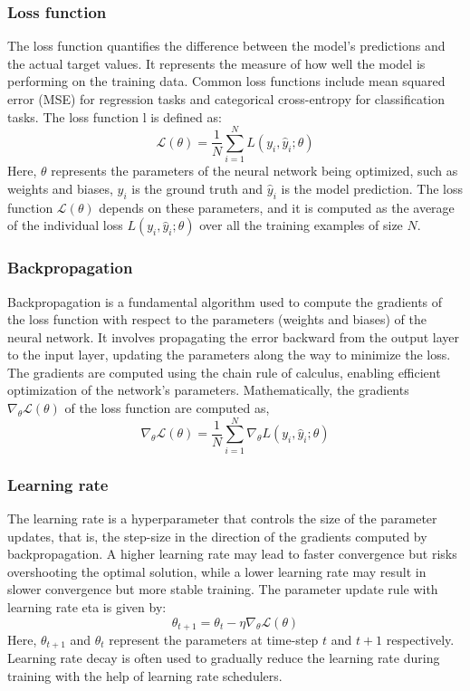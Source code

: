 \subsubsection{Loss function}
The loss function quantifies the difference between the model's predictions and the actual target values. It represents the measure of how well the model is performing on the training data. Common loss functions include mean squared error (MSE) for regression tasks and categorical cross-entropy for classification tasks. The loss function \gls{l} is defined as: 
\begin{equation}
    \mathcal{L}(\theta)=\frac{1}{N} \sum_{i=1}^N L\left(y_i, \hat{y}_i ; \theta\right)
    \end{equation}
Here, $\theta$ represents the parameters of the neural network being optimized, such as weights and biases, $y_i$ is the ground truth and $\hat{y}_i $ is the model prediction. The loss function $\mathcal{L}(\theta)$ depends on these parameters, and it is computed as the average of the individual loss $L\left(y_i, \hat{y}_i ; \theta\right)$ over all the training examples of size $N$.
\subsubsection{Backpropagation}
Backpropagation is a fundamental algorithm used to compute the gradients of the loss function with respect to the parameters (weights and biases) of the neural network. It involves propagating the error backward from the output layer to the input layer, updating the parameters along the way to minimize the loss. The gradients are computed using the chain rule of calculus, enabling efficient optimization of the network's parameters. Mathematically, the gradients $\nabla_\theta \mathcal{L}(\theta)$ of the loss function are computed as,
\begin{equation}
    \nabla_\theta \mathcal{L}(\theta)=\frac{1}{N} \sum_{i=1}^N \nabla_\theta L\left(y_i, \hat{y}_i ; \theta\right)
    \end{equation}
\subsubsection{Learning rate}
The learning rate is a hyperparameter that controls the size of the parameter updates, that is, the step-size in the direction of the gradients computed by backpropagation. A higher learning rate may lead to faster convergence but risks overshooting the optimal solution, while a lower learning rate may result in slower convergence but more stable training. The parameter update rule with learning rate \gls{eta} is given by:
\begin{equation}
    \theta_{t+1}=\theta_t-\eta \nabla_\theta \mathcal{L}(\theta)
    \end{equation}
Here, $\theta_{t+1}$ and $\theta_t$ represent the parameters at time-step $t$ and $t+1$ respectively. Learning rate decay is often used to gradually reduce the learning rate during training with the help of learning rate schedulers.
